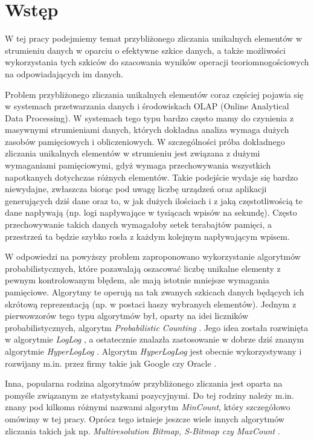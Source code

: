 \chapter{Wstęp}
\thispagestyle{chapterBeginStyle}

W tej pracy podejmiemy temat przybliżonego zliczania unikalnych elementów w strumieniu danych w oparciu o efektywne szkice danych, a także możliwości wykorzystania tych szkiców do szacowania wyników operacji teoriomnogościowych na odpowiadających im danych.

Problem przybliżonego zliczania unikalnych elementów coraz częściej pojawia się w systemach przetwarzania danych i środowiskach OLAP (Online Analytical Data Processing).
W systemach tego typu bardzo często mamy do czynienia z masywnymi strumieniami danych, których dokładna  analiza wymaga dużych zasobów pamięciowych i obliczeniowych. W szczególności próba dokładnego zliczania unikalnych elementów w strumieniu jest związana z dużymi wymaganiami pamięciowymi,  gdyż wymaga przechowywania wszystkich napotkanych dotychczas różnych elementów.
Takie podejście wydaje się bardzo niewydajne,
zwłaszcza biorąc pod uwagę liczbę urządzeń oraz aplikacji generujących dziś dane 
oraz to,  w jak dużych ilościach i z jaką częstotliwością te dane napływają
(np. logi napływające w tysiącach wpisów na sekundę).
Często przechowywanie takich danych wymagałoby
setek terabajtów pamięci, a przestrzeń ta będzie szybko rosła z każdym kolejnym napływającym wpisem.

W odpowiedzi na powyższy problem zaproponowano wykorzystanie algorytmów probabilistycznych, które pozawalają oszacować liczbę unikalne elementy z pewnym kontrolowanym błędem, ale mają istotnie mniejsze wymagania pamięciowe. Algorytmy te operują na tak zwanych szkicach danych będących ich skrótową reprezentacją (np. w postaci haszy wybranych elementów). Jednym z pierwowzorów tego typu algorytmów był, oparty na idei liczników probabilistycznych, algorytm \textit{Probabilistic Counting} \cite{linear}. 
Jego idea została rozwinięta w algorytmie \textit{LogLog} \cite{loglog},
a ostatecznie znalazła zastosowanie w dobrze dziś znanym
algorytmie \textit{HyperLogLog} \cite{hll}.
Algorytm \textit{HyperLogLog} jest obecnie wykorzystywany i rozwijany m.in. przez firmy takie 
jak Google \cite{hllpp} czy Oracle \cite{oracle}.  

Inna, popularna rodzina algorytmów przybliżonego zliczania jest oparta na pomyśle związanym ze statystykami pozycyjnymi. Do tej rodziny należy m.in. znany pod kilkoma różnymi nazwami algorytm \textit{MinCount}, który szczegółowo omówimy w tej pracy. Oprócz tego istnieje jeszcze wiele innych algorytmów zliczania takich jak np. \textit{Multiresolution Bitmap, S-Bitmap czy MaxCount}
\cite{streamed}.

